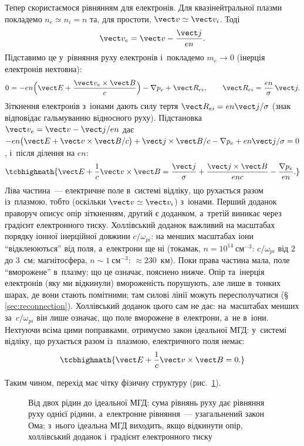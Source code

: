 Тепер скористаємося рівнянням для електронів. Для квазінейтральної плазми покладемо
$n_e\simeq n_i=n$ та, для простоти, $\vect v\simeq\vect v_i$. Тоді
\begin{equation*}
\vect v_e=\vect v-\frac{\vect j}{en}.
\end{equation*}
Підставимо це у~рівняння руху електронів і~покладемо $m_e\to0$ (інерція електронів нехтовна):
\[0=-en\Bigl(\vect E+\frac{\vect v_e\times\vect B}c\Bigr)-\nabla p_e+\vect R_{ei},\qquad
\vect R_{ei}=\frac{en}{\sigma}\,\vect j.\]
Зіткнення електронів з~іонами дають силу тертя $\vect R_{ei}=en\vect j/\sigma$ (знак відповідає гальмуванню відносного руху).
Підстановка $\vect v_e=\vect v-\vect j/en$ дає
$-en\bigl(\vect E+\vect v\times\vect B/c\bigr)+\vect j\times\vect B/c-\nabla p_e+en\vect j/\sigma=0$, і~після ділення на $en$:
\begin{equation}\label{eq:generalized-ohm-from-two-fluid}
\tcbhighmath{
    \vect E+\frac1c\vect v\times\vect B
    =
    \frac{\vect j}{\sigma}
    +
    \frac{\vect j\times\vect B}{enc}
    -
    \frac{\nabla p_e}{en}.
}
\end{equation}
Ліва частина~--- електричне поле в~системі відліку, що рухається разом із~плазмою, тобто (оскільки $\vect v\simeq\vect v_i$)
з~іонами. Перший доданок праворуч описує опір зіткненням, другий є  доданком,
а~третій виникає через градієнт електронного тиску. Холлівський доданок важливий на масштабах порядку іонної інерційної довжини $c/\omega_{pi}$: на менших масштабах іони \enquote{відклеюються}
від поля, а~електрони ще ні (токамак, $n=10^{14}~\mathrm{см}^{-3}$: $c/\omega_{pi}$ від $2$ до $3$~см; магнітосфера, $n\sim1~\mathrm{см}^{-3}$: $\approx230$~км).
Поки права частина мала, поле \enquote{вморожене} в~плазму; що це означає, пояснено нижче. Опір та~інерція
електронів (яку ми відкинули) вмороженість порушують, але лише в~тонких шарах, де вони стають помітними;
там силові лінії можуть пересполучатися (§\,\ref{sec:reconnection}). Холлівський доданок цього сам не дає:
на~масштабах менших за~$c/\omega_{pi}$ він лише означає, що поле вморожене в~електрони, а~не в~іони.
Нехтуючи всіма цими поправками, отримуємо закон ідеальної МГД: у~системі відліку, що рухається разом із~плазмою,
електричного поля немає:
\begin{equation}\label{eq:ideal-mhd-ohm}
\tcbhighmath{
\vect E+\frac1c\vect v\times\vect B=0.
}
\end{equation}

Таким чином, перехід має чітку фізичну структуру (рис.~\ref{pic:two-to-one-fluid}).
\begin{figure}[ht]
    \centering
    \caption{Від двох рідин до ідеальної МГД: сума рівнянь руху дає рівняння руху однієї рідини,
    а~електронне рівняння~--- узагальнений закон Ома; з~нього ідеальна МГД виходить, якщо відкинути опір, холлівський доданок і~градієнт електронного тиску}
    \label{pic:two-to-one-fluid}
\end{figure}

